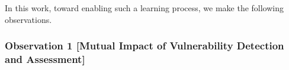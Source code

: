 In this work, toward enabling such a learning process, we make the
following observations.







\subsubsection{{\bf Observation 1} [Mutual Impact of Vulnerability
    Detection and Assessment]}

